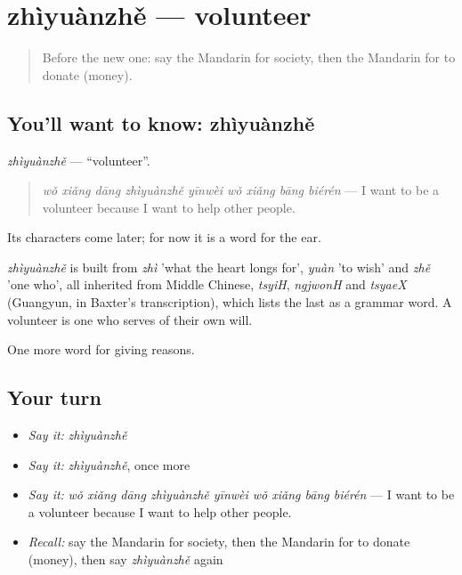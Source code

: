 \section[zhìyuànzhě]{zhìyuànzhě — volunteer}

\label{lesson:ZH-C375-zhiyuanzhe}



\begin{quote}
Before the new one: say the Mandarin for society, then the Mandarin for to donate (money).
\end{quote}

\subsection*{You'll want to know: zhìyuànzhě}
\emph{zhìyuànzhě} — \textquotedblleft{}volunteer\textquotedblright{}.

\begin{quote}
\emph{wǒ xiǎng dāng zhìyuànzhě yīnwèi wǒ xiǎng bāng biérén} — I want to be a volunteer because I want to help other people.
\end{quote}

Its characters come later; for now it is a word for the ear.

\begin{cousinweb}
\emph{zhìyuànzhě} is built from \emph{zhì} 'what the heart longs for', \emph{yuàn} 'to wish' and \emph{zhě} 'one who', all inherited from Middle Chinese, \emph{tsyiH}, \emph{ngjwonH} and \emph{tsyaeX} (Guangyun, in Baxter's transcription), which lists the last as a grammar word. A volunteer is one who serves of their own will.
\end{cousinweb}

\begin{grammarlens}[title={What you've built}]
One more word for giving reasons.
\end{grammarlens}

\subsection*{Your turn}
\begin{itemize}
\raggedright
  \item \emph{Say it:} \emph{zhìyuànzhě}
  \item \emph{Say it:} \emph{zhìyuànzhě}, once more
  \item \emph{Say it:} \emph{wǒ xiǎng dāng zhìyuànzhě yīnwèi wǒ xiǎng bāng biérén} — I want to be a volunteer because I want to help other people.
  \item \emph{Recall:} say the Mandarin for society, then the Mandarin for to donate (money), then say \emph{zhìyuànzhě} again
\end{itemize}

